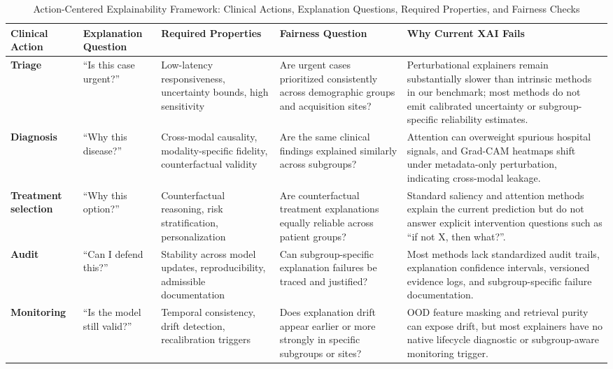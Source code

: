 \documentclass[pdflatex,sn-mathphys-num]{sn-jnl}%
\theoremstyle{thmstyleone}%
\theoremstyle{thmstyletwo}%
\theoremstyle{thmstylethree}%
\begin{document}
\begin{table}[h!]
\centering
\caption{Action-Centered Explainability Framework: Clinical Actions, Explanation Questions, Required Properties, and Fairness Checks}
\label{tab:ace_framework}
{\scriptsize
\setlength{\tabcolsep}{3pt}
\renewcommand{\arraystretch}{1.2}
\begin{tabularx}{\textwidth}{|L{1.7cm}|L{2.0cm}|L{2.5cm}|L{3.0cm}|X|}
\hline
\textbf{Clinical Action} &
\textbf{Explanation Question} &
\textbf{Required Properties} &
\textbf{Fairness Question} &
\textbf{Why Current XAI Fails} \\ \hline

\textbf{Triage} &
``Is this case urgent?'' &
Low-latency responsiveness, uncertainty bounds, high sensitivity &
Are urgent cases prioritized consistently across demographic groups and acquisition sites? &
Perturbational explainers remain substantially slower than intrinsic methods in our benchmark; most methods do not emit calibrated uncertainty or subgroup-specific reliability estimates. \\ \hline

\textbf{Diagnosis} &
``Why this disease?'' &
Cross-modal causality, modality-specific fidelity, counterfactual validity &
Are the same clinical findings explained similarly across subgroups? &
Attention can overweight spurious hospital signals, and Grad-CAM heatmaps shift under metadata-only perturbation, indicating cross-modal leakage. \\ \hline

\textbf{Treatment selection} &
``Why this option?'' &
Counterfactual reasoning, risk stratification, personalization &
Are counterfactual treatment explanations equally reliable across patient groups? &
Standard saliency and attention methods explain the current prediction but do not answer explicit intervention questions such as ``if not X, then what?''. \\ \hline

\textbf{Audit} &
``Can I defend this?'' &
Stability across model updates, reproducibility, admissible documentation &
Can subgroup-specific explanation failures be traced and justified? &
Most methods lack standardized audit trails, explanation confidence intervals, versioned evidence logs, and subgroup-specific failure documentation. \\ \hline

\textbf{Monitoring} &
``Is the model still valid?'' &
Temporal consistency, drift detection, recalibration triggers &
Does explanation drift appear earlier or more strongly in specific subgroups or sites? &
OOD feature masking and retrieval purity can expose drift, but most explainers have no native lifecycle diagnostic or subgroup-aware monitoring trigger. \\ \hline

\end{tabularx}
\par}
\end{table}
\end{document}
